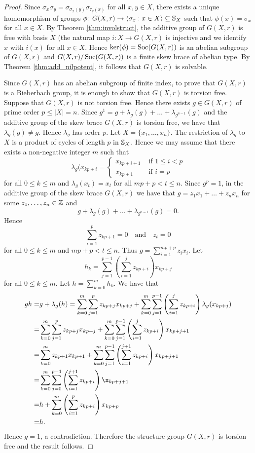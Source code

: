 \begin{proof}
Since $\sigma_x\sigma_y=\sigma_{\sigma_x(y)}\sigma_{\tau_y(x)}$ for all $x,y\in X$, there exists a unique homomorphism of groups
$\phi\colon G(X,r)\to\langle \sigma_x : x\in X\rangle\subseteq\mathbb{S}_X$ such that $\phi(x)=\sigma_x$ for all $x\in X$. By Theorem \ref{thm:involstruct}, the additive group of $G(X,r)$ is free with basis $X$ (the natural map $i\colon X\to G(X,r)$ is injective and we identify $x$ with $i(x)$ for all $x\in X$. Hence $\ker(\phi)=\operatorname{Soc}(G(X,r))$ is an abelian subgroup of $G(X,r)$ and $G(X,r)/\operatorname{Soc}(G(X,r))$ is a finite skew brace of abelian type. By Theorem \ref{thm:add_nilpotent}, it follows that $G(X,r)$ is solvable.

Since $G(X,r)$ has an abelian subgroup of finite index, to prove that $G(X,r)$ is a Bieberbach group, it is enough to show that $G(X,r)$ is torsion free.
Suppose that $G(X,r)$ is not torsion free. Hence there exists $g\in G(X,r)$ of prime order $p\leq |X|=n$. Since
$g^1=g+\lambda_g(g)+\dots +\lambda_{g^{n-1}}(g)$ and the additive group of the skew brace $G(X,r)$ is torsion free, we have that $\lambda_g(g)\neq g$. Hence $\lambda_g$ has order $p$. Let $X=\{ x_1,\dots ,x_n\}$. The restriction of $\lambda_g$ to $X$ is a product of cycles of length $p$ in $\mathbb{S}_X$. Hence we may assume that there exists a non-negative integer $m$ such that
\[\lambda_g(x_{kp+i}=\left\{\begin{array}{ll}
x_{kp+i+1}&\text{ if }1\leq i<p\\
x_{kp+1}&\text{ if }i=p\end{array}\right.\]
for all $0\leq k\leq m$ and $\lambda_g(x_t)=x_t$ for all $mp+p<t\leq n$.
Since $g^p=1$, in the additive group of the skew brace $G(X,r)$ we have that $g=z_1x_1+\dots +z_nx_n$ for some $z_1,\dots ,z_n\in\mathbb{Z}$ and 
\[g+\lambda_g(g)+\dots +\lambda_{g^{n-1}}(g)=0.\]
Hence
\[\sum_{i=1}^pz_{kp+1}=0\quad\text{and}\quad z_t=0\]
for all $0\leq k\leq m$ and $mp+p<t\leq n$. Thus $g=\sum_{i=1}^{mp+p}z_ix_i$. Let
\[ h_k=\sum_{j=1}^{p-1}\left(\sum_{i=1}^jz_{kp+i}\right)x_{kp+j}\]
for all $0\leq k\leq m$. Let $h=\sum_{k=0}^mh_k$. We have that
\begin{align*}
    gh=&g+\lambda_g(h)=\sum_{k=0}^m\sum_{j=1}^pz_{kp+j}x_{kp+j}+\sum_{k=0}^m\sum_{j=1}^{p-1}\left(\sum_{i=1}^jz_{kp+i}\right)\lambda_g(x_{kp+j})\\
    =&\sum_{k=0}^m\sum_{j=1}^pz_{kp+j}x_{kp+j}+\sum_{k=0}^m\sum_{j=1}^{p-1}\left(\sum_{i=1}^jz_{kp+i}\right)x_{kp+j+1}\\
    =&\sum_{k=0}^mz_{kp+1}x_{kp+1}+\sum_{k=0}^m\sum_{j=1}^{p-1}\left(\sum_{i=1}^{j+1}z_{kp+i}\right)x_{kp+j+1}\\
    =&\sum_{k=0}^m\sum_{j=0}^{p-1}\left(\sum_{i=1}^{j+1}z_{kp+i}\right)\x_{kp+j+1}\\
    =&h+\sum_{k=0}^m\left(\sum_{i=1}^pz_{kp+i}\right)x_{kp+p}\\
    =&h.
\end{align*}
Hence $g=1$, a contradiction. Therefore the structure group $G(X,r)$ is torsion free and the result follows.
\end{proof}




